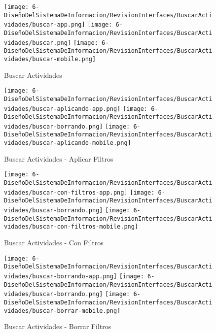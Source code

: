 \begin{figure}[H]
	\centering
	\texttt{[image: 6-DiseñoDelSistemaDeInformacion/RevisionInterfaces/BuscarActividades/buscar-app.png]}
	\texttt{[image: 6-DiseñoDelSistemaDeInformacion/RevisionInterfaces/BuscarActividades/buscar.png]}
	\texttt{[image: 6-DiseñoDelSistemaDeInformacion/RevisionInterfaces/BuscarActividades/buscar-mobile.png]}
	\caption{Buscar Actividades}
\end{figure}

\begin{figure}[H]
	\centering
	\texttt{[image: 6-DiseñoDelSistemaDeInformacion/RevisionInterfaces/BuscarActividades/buscar-aplicando-app.png]}
	\texttt{[image: 6-DiseñoDelSistemaDeInformacion/RevisionInterfaces/BuscarActividades/buscar-borrando.png]}
	\texttt{[image: 6-DiseñoDelSistemaDeInformacion/RevisionInterfaces/BuscarActividades/buscar-aplicando-mobile.png]}
	\caption{Buscar Actividades - Aplicar Filtros}
\end{figure}

\begin{figure}[H]
	\centering
	\texttt{[image: 6-DiseñoDelSistemaDeInformacion/RevisionInterfaces/BuscarActividades/buscar-con-filtros-app.png]}
	\texttt{[image: 6-DiseñoDelSistemaDeInformacion/RevisionInterfaces/BuscarActividades/buscar-borrando.png]}
	\texttt{[image: 6-DiseñoDelSistemaDeInformacion/RevisionInterfaces/BuscarActividades/buscar-con-filtros-mobile.png]}
	\caption{Buscar Actividades - Con Filtros}
\end{figure}


\begin{figure}[H]
	\centering
	\texttt{[image: 6-DiseñoDelSistemaDeInformacion/RevisionInterfaces/BuscarActividades/buscar-borrando-app.png]}
	\texttt{[image: 6-DiseñoDelSistemaDeInformacion/RevisionInterfaces/BuscarActividades/buscar-borrando.png]}
	\texttt{[image: 6-DiseñoDelSistemaDeInformacion/RevisionInterfaces/BuscarActividades/buscar-borrar-mobile.png]}
	\caption{Buscar Actividades - Borrar Filtros}
\end{figure}

